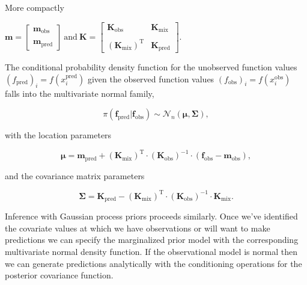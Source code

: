          \vspace{1em}
         
         More compactly

         \vspace{1em}

         \(\mathbf{m} = 
         \begin{bmatrix}
            \mathbf{m}_{\text{obs}} \\
            \\
            \mathbf{m}_{\text{pred}}
         \end{bmatrix}  
         \: 
         \text{and}
         \:
         \mathbf{K} = 
         \begin{bmatrix}
            \mathbf{K}_{\text{obs}} & \mathbf{K}_{\text{mix}} \\
            \\
            (\mathbf{K}_{\text{mix}})^{\text{T}} & \mathbf{K}_{\text{pred}}
         \end{bmatrix}\).

         \vspace{1em}

         The conditional probability density function for the unobserved function values \((f_{\text{pred}})_{i} = f(x_{i}^{\text{pred}})\) given the observed function values  \((f_{\text{obs}})_{i} = f(x_{i}^{\text{obs}})\) falls into the multivariate normal family,

         \[\pi(\mathbf{f}_{\text{pred}} | \mathbf{f}_{\text{obs}}) \sim \mathcal{N}_{n}(\boldsymbol{\mu}, \boldsymbol{\Sigma}),\]

         with the location parameters 

         \[\boldsymbol{\mu} = \mathbf{m}_{\text{pred}} + (\mathbf{K}_{\text{mix}})^{\text{T}} \cdot (\mathbf{K}_{\text{obs}})^{-1} \cdot (\mathbf{f}_{\text{obs}} - \mathbf{m}_{\text{obs}}),\]

         and the covariance matrix parameters

         \[\boldsymbol{\Sigma} = \mathbf{K}_{\text{pred}} - (\mathbf{K}_{\text{mix}})^{\text{T}} \cdot (\mathbf{K}_{\text{obs}})^{-1} \cdot \mathbf{K}_{\text{mix}}.\]

         Inference with Gaussian process priors proceeds similarly. Once we've identified the covariate values at which we have observations or will want to make predictions we can specify the marginalized prior model with the corresponding multivariate normal density function. If the observational model is normal then we can generate predictions analytically with the conditioning operations for the posterior covariance function.
